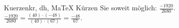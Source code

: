 \begin{MAufgabe}{Kuerzen}{kr, dh, MaTeX}
K\"urzen Sie soweit m\"oglich: $\frac{-1920}{2680}$.\\ 
\ifLsg\MLoesung
\quad $\frac{-1920}{2680}=\frac{(40)\cdot(-48)}{(40)\cdot(67)}=\frac{-48}{67}$.\else\relax\fi
 \end{MAufgabe}